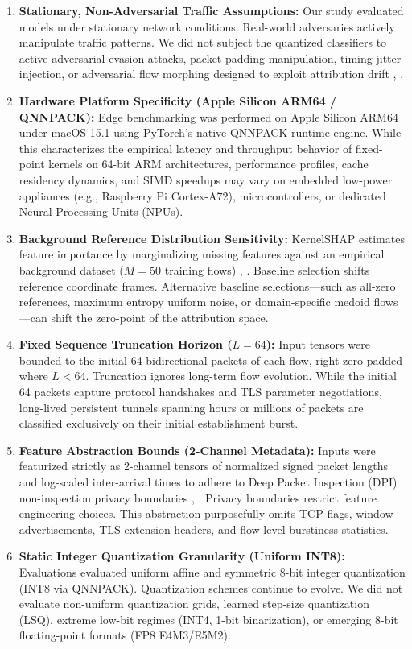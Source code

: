 \documentclass[conference]{IEEEtran}
\begin{document}
\begin{enumerate}
    \item \textbf{Stationary, Non-Adversarial Traffic Assumptions:} Our study evaluated models under stationary network conditions. Real-world adversaries actively manipulate traffic patterns. We did not subject the quantized classifiers to active adversarial evasion attacks, packet padding manipulation, timing jitter injection, or adversarial flow morphing designed to exploit attribution drift \cite{b28}, \cite{b31}.
    \item \textbf{Hardware Platform Specificity (Apple Silicon ARM64 / QNNPACK):} Edge benchmarking was performed on Apple Silicon ARM64 under macOS 15.1 using PyTorch's native QNNPACK runtime engine. While this characterizes the empirical latency and throughput behavior of fixed-point kernels on 64-bit ARM architectures, performance profiles, cache residency dynamics, and SIMD speedups may vary on embedded low-power appliances (e.g., Raspberry Pi Cortex-A72), microcontrollers, or dedicated Neural Processing Units (NPUs).
    \item \textbf{Background Reference Distribution Sensitivity:} KernelSHAP estimates feature importance by marginalizing missing features against an empirical background dataset ($M = 50$ training flows) \cite{b32}, \cite{b29}. Baseline selection shifts reference coordinate frames. Alternative baseline selections—such as all-zero references, maximum entropy uniform noise, or domain-specific medoid flows—can shift the zero-point of the attribution space.
    \item \textbf{Fixed Sequence Truncation Horizon ($L = 64$):} Input tensors were bounded to the initial 64 bidirectional packets of each flow, right-zero-padded where $L < 64$. Truncation ignores long-term flow evolution. While the initial 64 packets capture protocol handshakes and TLS parameter negotiations, long-lived persistent tunnels spanning hours or millions of packets are classified exclusively on their initial establishment burst.
    \item \textbf{Feature Abstraction Bounds (2-Channel Metadata):} Inputs were featurized strictly as 2-channel tensors of normalized signed packet lengths and log-scaled inter-arrival times to adhere to Deep Packet Inspection (DPI) non-inspection privacy boundaries \cite{b7}, \cite{b8}. Privacy boundaries restrict feature engineering choices. This abstraction purposefully omits TCP flags, window advertisements, TLS extension headers, and flow-level burstiness statistics.
    \item \textbf{Static Integer Quantization Granularity (Uniform INT8):} Evaluations evaluated uniform affine and symmetric 8-bit integer quantization (INT8 via QNNPACK). Quantization schemes continue to evolve. We did not evaluate non-uniform quantization grids, learned step-size quantization (LSQ), extreme low-bit regimes (INT4, 1-bit binarization), or emerging 8-bit floating-point formats (FP8 E4M3/E5M2).

\end{enumerate}
\end{document}
